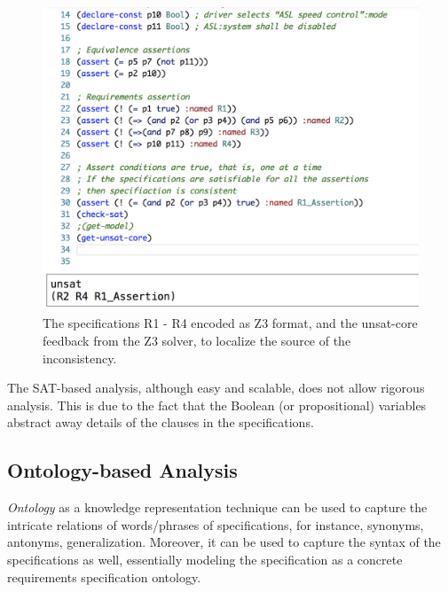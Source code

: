 \begin{figure}[h]
	\centering
	\includegraphics[width=0.7\linewidth]{images/z3}
	\caption{The \resa{} specifications R1 - R4 encoded as Z3 format, and the unsat-core feedback from the Z3 solver, to localize the source of the inconsistency.}
	\label{fig_z3}
\end{figure}

The SAT-based analysis, although easy and scalable, does not allow rigorous analysis. This is due to the fact that the Boolean (or propositional) variables abstract away details of the clauses in the specifications. %

\subsection*{Ontology-based Analysis}
\textit{Ontology} as a knowledge representation technique can be used to capture the intricate relations of words/phrases of specifications, for instance, synonyms, antonyms, generalization. Moreover, it can be used to capture the syntax of the specifications as well, essentially modeling the \resa{} specification as a concrete requirements specification ontology. 

